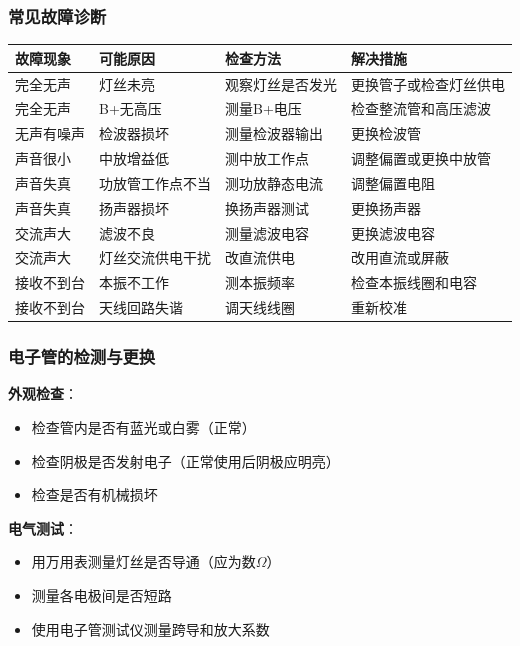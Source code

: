 \subsubsection{常见故障诊断}
\label{sec:tube_radio_troubleshoot}

\begin{center}
\begin{tabular}{|p{3cm}|p{4cm}|p{4cm}|p{3cm}|}
\hline
\textbf{故障现象} & \textbf{可能原因} & \textbf{检查方法} & \textbf{解决措施} \\
\hline
完全无声 & 灯丝未亮 & 观察灯丝是否发光 & 更换管子或检查灯丝供电 \\
完全无声 & B+无高压 & 测量B+电压 & 检查整流管和高压滤波 \\
无声有噪声 & 检波器损坏 & 测量检波器输出 & 更换检波管 \\
声音很小 & 中放增益低 & 测中放工作点 & 调整偏置或更换中放管 \\
声音失真 & 功放管工作点不当 & 测功放静态电流 & 调整偏置电阻 \\
声音失真 & 扬声器损坏 & 换扬声器测试 & 更换扬声器 \\
交流声大 & 滤波不良 & 测量滤波电容 & 更换滤波电容 \\
交流声大 & 灯丝交流供电干扰 & 改直流供电 & 改用直流或屏蔽 \\
接收不到台 & 本振不工作 & 测本振频率 & 检查本振线圈和电容 \\
接收不到台 & 天线回路失谐 & 调天线线圈 & 重新校准 \\
\hline
\end{tabular}
\end{center}

\subsubsection{电子管的检测与更换}
\label{sec:tube_testing}

\textbf{外观检查}：
\begin{itemize}
    \item 检查管内是否有蓝光或白雾（正常）
    \item 检查阴极是否发射电子（正常使用后阴极应明亮）
    \item 检查是否有机械损坏
\end{itemize}

\textbf{电气测试}：
\begin{itemize}
    \item 用万用表测量灯丝是否导通（应为数$\Omega$）
    \item 测量各电极间是否短路
    \item 使用电子管测试仪测量跨导和放大系数
\end{itemize}


